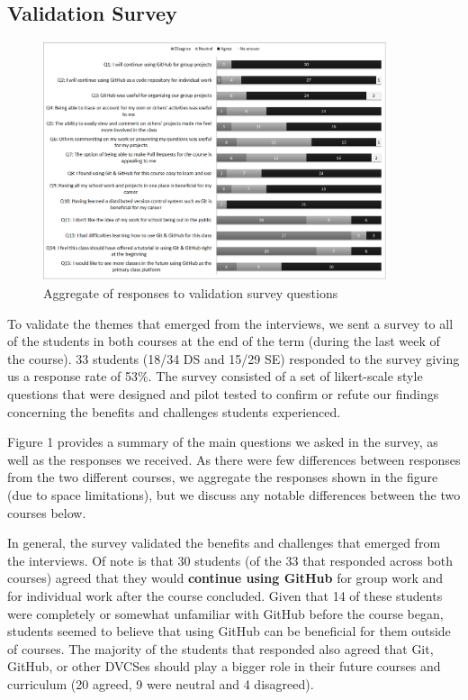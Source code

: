 
\subsection{Validation Survey}
\begin{figure}[t]
\centering
\includegraphics[width=0.9\textwidth]{surveychart}
\vspace{-4pt}
\caption{Aggregate of responses to validation survey questions}
\vspace{-12pt}
\end{figure}

To validate the themes that emerged from the interviews, we sent a survey to all of the students in both courses at the end of the term (during the last week of the course). 33 students (18/34 DS and 15/29 SE) responded to the survey giving us a response rate of 53\%.  The survey consisted of a set of likert-scale style questions that were designed and pilot tested to confirm or refute our findings concerning the benefits and challenges students experienced.

Figure 1 provides a summary of the main questions we asked in the survey, as well as the responses we received.
As there were few differences between responses from the two different courses, we aggregate the responses shown in the figure (due to space limitations), but we discuss any notable differences between the two courses below.

In general, the survey validated the benefits and challenges that emerged from the interviews.
Of note is that 30 students (of the 33 that responded across both courses) agreed that they would \textbf{continue using GitHub} for group work and for individual work after the course concluded. Given that 14 of these students were completely or somewhat unfamiliar with GitHub before the course began, students seemed to believe that using GitHub can be beneficial for them outside of courses.
The majority of the students that responded also agreed that Git, GitHub, or other DVCSes should play a bigger role in their future courses and curriculum (20 agreed, 9 were neutral and 4 disagreed).

